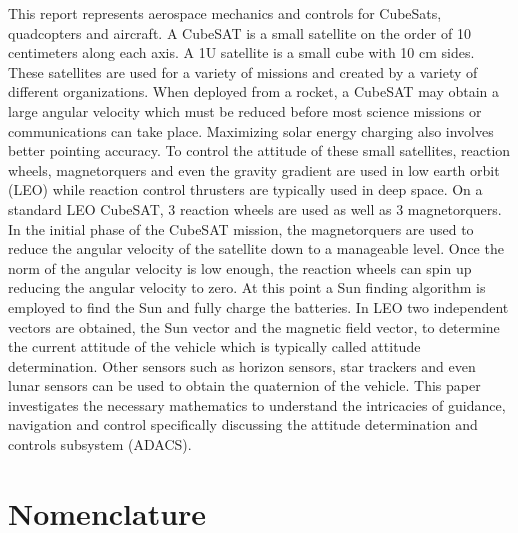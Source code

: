 \documentclass{article}
\begin{document}
This report represents aerospace mechanics and controls for CubeSats,
quadcopters and aircraft. A CubeSAT is a small satellite on the order
of 10 centimeters along each axis. A 1U satellite is a small cube with
10 cm sides. These satellites are used for a variety of missions and
created by a variety of different organizations. When deployed from 
a rocket, a CubeSAT may obtain a large angular velocity
which must be reduced before most science missions or communications
can take place. Maximizing solar energy charging also involves
better pointing accuracy. To control the attitude of these small
satellites, reaction wheels, magnetorquers and even the gravity
gradient are used in low earth orbit (LEO) while reaction control thrusters
are typically used in deep space.  On a standard LEO CubeSAT, 3 reaction
wheels are used as well as 3 magnetorquers. In the initial phase of
the CubeSAT mission, the magnetorquers are used to reduce the angular
velocity of the satellite down to a manageable level. Once the norm of the angular velocity is
low enough, the reaction wheels can spin up reducing the angular
velocity to zero. At this point a Sun finding algorithm is employed to
find the Sun and fully charge the batteries. In LEO two independent
vectors are obtained, the Sun vector and the magnetic field vector, to
determine the current attitude of the vehicle which is typically
called attitude determination. Other sensors such as horizon sensors,
star trackers and even lunar sensors can be used to obtain the
quaternion of the vehicle. This paper investigates the necessary
mathematics to understand the intricacies of guidance, navigation and
control specifically discussing the attitude determination and
controls subsystem (ADACS).

\section{Nomenclature}
\end{document}
